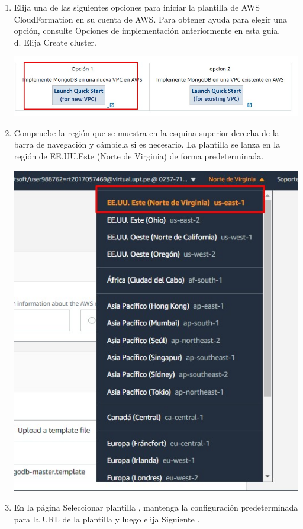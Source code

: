 \documentclass[12pt,letterpaper]{article}
\begin{document}
\begin{enumerate}
\begin{enumerate}
		\item Elija una de las siguientes opciones para iniciar la plantilla de AWS CloudFormation en su cuenta de AWS. Para obtener ayuda para elegir una opción, consulte Opciones de implementación anteriormente en esta guía.
	\\	d. Elija Create cluster.
		\begin{center}
			\includegraphics[width=14cm]{./img/2.1.jpg} 
		\end{center}
		\item Compruebe la región que se muestra en la esquina superior derecha de la barra de navegación y cámbiela si es necesario. La plantilla se lanza en la región de EE.UU.Este (Norte de Virginia) de forma predeterminada.
		\begin{center}
			\includegraphics[width=14cm]{./img/2.2.jpg} 
		\end{center}
		\item En la página Seleccionar plantilla , mantenga la configuración predeterminada para la URL de la plantilla y luego elija Siguiente .
		

\end{enumerate}
\end{enumerate}
\end{document}
